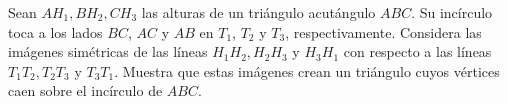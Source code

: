 Sean $ AH_1, BH_2, CH_3$ las alturas de un triángulo acutángulo $ABC$. Su incírculo toca a los lados $BC$, $AC$ y $AB$ en $T_1$, $T_2$ y $T_3$, respectivamente. Considera las imágenes simétricas de las líneas $ H_1H_2, H_2H_3$ y $ H_3H_1$ con respecto a las líneas $ T_1T_2, T_2T_3$ y $ T_3T_1$. Muestra que estas imágenes crean un triángulo cuyos vértices caen sobre el incírculo de $ABC$.